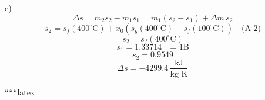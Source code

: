e)
\[
\Delta s = m_2 s_2 - m_1 s_1 = m_1 (s_2 - s_1) + \Delta m \, s_2
\]
\[
s_2 = s_f(400^\circ \text{C}) + x_0 \left( s_g(400^\circ \text{C}) - s_f(100^\circ \text{C}) \right) \quad \text{(A-2)}
\]
\[
s_2 = s_f(400^\circ \text{C})
\]
\[
s_1 = 1.33714 \quad \text{= 1B}
\]
\[
s_2 = 0.9549
\]
\[
\Delta s = -4299.4 \, \frac{\text{kJ}}{\text{kg K}}
\]

\underline{\hspace{5cm}}

``````latex